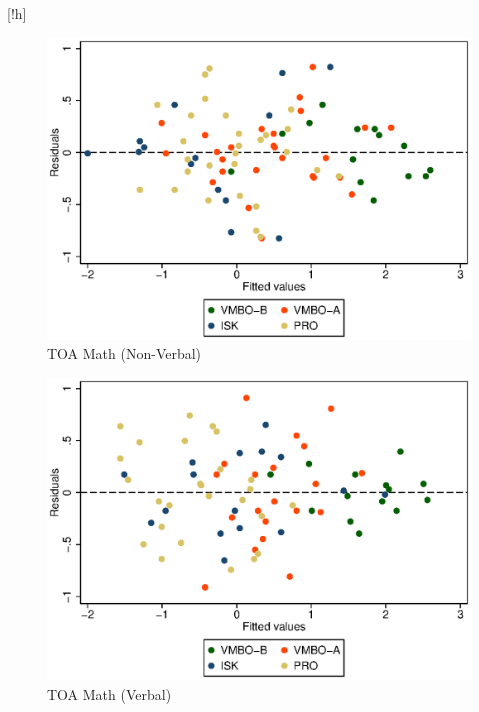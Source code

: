 \documentclass[ 12 pt]{article}
\makeatletter
\renewenvironment{figure}%
{\renewcommand\familydefault\sfdefault
	\@float{figure}}
{\end@float}
\makeatother
\begin{document}
\begin{figure}[!h]
\begin{subfigure}{.5\textwidth}
  \centering
	\includegraphics[width=.8\linewidth]{rvfplot_toarekenen_nv2NEW.eps}
  \caption{TOA Math (Non-Verbal)}
  \label{fig:rvf_toaNV}
\end{subfigure}%
\begin{subfigure}{.5\textwidth}
  \centering
  \includegraphics[width=.8\linewidth]{rvfplot_toarekenen2NEW.eps}
  \caption{TOA Math (Verbal)}
	\label{fig:rvf_toa}
\end{subfigure}
\caption{Residual versus fitted plot after estimation in models 1 of Table \ref{tab:toarekNV} (\ref{fig:rvf_toaNV}) and \ref{tab:toarek} (\ref{fig:rvf_toa})}
\label{fig:rvfplots}
\end{figure}
\end{document}
